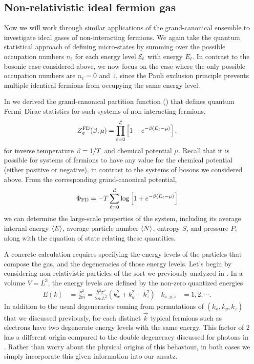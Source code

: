 \subsection{\label{sec:fermi_nonrel}Non-relativistic ideal fermion gas}
Now we will work through similar applications of the grand-canonical ensemble to investigate ideal gases of non-interacting fermions.
We again take the quantum statistical approach of defining micro-states by summing over the possible occupation numbers $n_{\ell}$ for each energy level $\mathcal E_{\ell}$ with energy $E_{\ell}$.
In contrast to the bosonic case considered above, we now focus on the case where the only possible occupation numbers are $n_{\ell} = 0$ and $1$, since the Pauli exclusion principle prevents multiple identical fermions from occupying the same energy level.

In  we derived the grand-canonical partition function () that defines quantum Fermi--Dirac statistics for such systems of non-interacting fermions,
\begin{equation*}
  Z_g^{\text{FD}}(\beta, \mu) = \prod_{\ell = 0}^{\mathcal L} \left[1 + e^{-\beta (E_{\ell} - \mu)}\right],
\end{equation*}
for inverse temperature $\beta = 1 / T$ and chemical potential $\mu$.
Recall that it is possible for systems of fermions to have any value for the chemical potential (either positive or negative), in contrast to the systems of bosons we considered above.
From the corresponding grand-canonical potential,
\begin{equation*}
  \Phi_{\text{FD}} = -T \sum_{\ell = 0}^{\mathcal L} \log\left[1 + e^{-\beta (E_{\ell} - \mu)}\right]
\end{equation*}
we can determine the large-scale properties of the system, including its average internal energy $\left\langle E \right\rangle$, average particle number $\left\langle N \right\rangle$, entropy $S$, and pressure $P$, along with the equation of state relating these quantities.

A concrete calculation requires specifying the energy levels of the particles that compose the gas, and the degeneracies of those energy levels.
Let's begin by considering non-relativistic particles of the sort we previously analyzed in .
In a volume $V = L^3$, the energy levels are defined by the non-zero quantized energies
\begin{align*}
  E(k) & = \frac{p^2}{2m} = \frac{\hbar^2 \pi^2}{2mL^2}\left(k_x^2 + k_y^2 + k_z^2\right) &
  k_{x, y, z} & = 1, 2, \cdots.
\end{align*}
In addition to the usual degeneracies coming from permutations of $(k_x, k_y, k_z)$ that we discussed previously, for each distinct $\vec k$ typical fermions such as electrons have two degenerate energy levels with the same energy.
This factor of $2$ has a different origin compared to the double degeneracy discussed for photons in .
Rather than worry about the physical origins of this behaviour, in both cases we simply incorporate this given information into our ansatz. %


